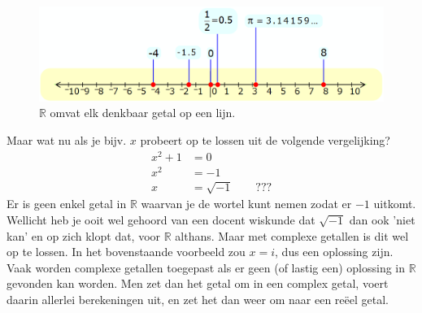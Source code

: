 \begin{figure}[h!]
    \centering
    \includegraphics[scale=0.35]{pictures/figuren/line.png}
    \caption{$\mathbb{R}$ omvat elk denkbaar getal op een lijn.}
    \label{fig:lijnreeel}
\end{figure}

Maar wat nu als je bijv. $x$ probeert op te lossen uit de volgende vergelijking?
\begin{align*}
    x^2 + 1 &= 0 \\
    x^2 &= -1 \\
    x &= \sqrt{-1} \qquad ???
\end{align*}
Er is geen enkel getal in $\mathbb{R}$ waarvan je de wortel kunt nemen zodat er $-1$ uitkomt. Wellicht heb je ooit wel gehoord van een docent wiskunde dat $\sqrt{-1}$ dan ook 'niet kan' en op zich klopt dat, voor $\mathbb{R}$ althans. Maar met complexe getallen is dit wel op te lossen. 
In het bovenstaande voorbeeld zou $x=i$, dus een oplossing zijn. Vaak worden complexe getallen toegepast als er geen (of lastig een) oplossing in $\mathbb{R}$ gevonden kan worden. Men zet dan het getal om in een complex getal, voert daarin allerlei berekeningen uit, en zet het dan weer om naar een reëel getal. \\

